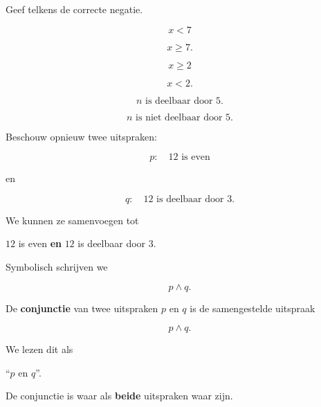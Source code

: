 \documentclass{ximera}
\begin{document}
  \begin{oefening}{\oefB \ESS}

  Geef telkens de correcte negatie.

  \begin{question}
  \[
  x<7
  \]

  \begin{oplossing}
  \[
  x\geq7.
  \]
  \end{oplossing}
  \end{question}


  \begin{question}
  \[
  x\geq2
  \]

  \begin{oplossing}
  \[
  x<2.
  \]
  \end{oplossing}
  \end{question}


  \begin{question}
  \[
  n\text{ is deelbaar door }5.
  \]

  \begin{oplossing}
  \[
  n\text{ is niet deelbaar door }5.
  \]
  \end{oplossing}
  \end{question}

  \end{oefening}



  Beschouw opnieuw twee uitspraken:

  \[
  p:\quad 12\text{ is even}
  \]

  en

  \[
  q:\quad 12\text{ is deelbaar door }3.
  \]

  We kunnen ze samenvoegen tot

  \begin{center}
  $12$ is even \textbf{en} $12$ is deelbaar door $3$.
  \end{center}

  Symbolisch schrijven we

  \[
  p\land q.
  \]


  \begin{definitie}
  De \textbf{conjunctie} van twee uitspraken $p$ en $q$ is de samengestelde
  uitspraak

  \[
  p\land q.
  \]

  We lezen dit als

  \begin{center}
  ``$p$ en $q$''.
  \end{center}

  De conjunctie is waar als \textbf{beide} uitspraken waar zijn.
  \end{definitie}
\end{document}
